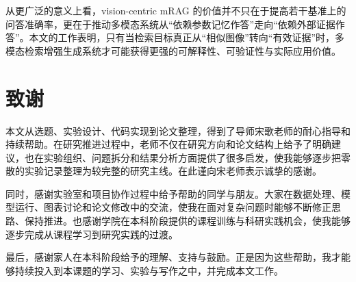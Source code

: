 从更广泛的意义上看，vision-centric mRAG 的价值并不只在于提高若干基准上的问答准确率，更在于推动多模态系统从“依赖参数记忆作答”走向“依赖外部证据作答”。本文的工作表明，只有当检索目标真正从“相似图像”转向“有效证据”时，多模态检索增强生成系统才可能获得更强的可解释性、可验证性与实际应用价值。




\chapter*{致\quad 谢}
本文从选题、实验设计、代码实现到论文整理，得到了导师宋歌老师的耐心指导和持续帮助。在研究推进过程中，老师不仅在研究方向和论文结构上给予了明确建议，也在实验组织、问题拆分和结果分析方面提供了很多启发，使我能够逐步把零散的实验记录整理为较完整的研究主线。在此谨向宋老师表示诚挚的感谢。

同时，感谢实验室和项目协作过程中给予帮助的同学与朋友。大家在数据处理、模型运行、图表讨论和论文修改中的交流，使我在面对复杂问题时能够不断修正思路、保持推进。也感谢学院在本科阶段提供的课程训练与科研实践机会，使我能够逐步完成从课程学习到研究实践的过渡。

最后，感谢家人在本科阶段给予的理解、支持与鼓励。正是因为这些帮助，我才能够持续投入到本课题的学习、实验与写作之中，并完成本文工作。
